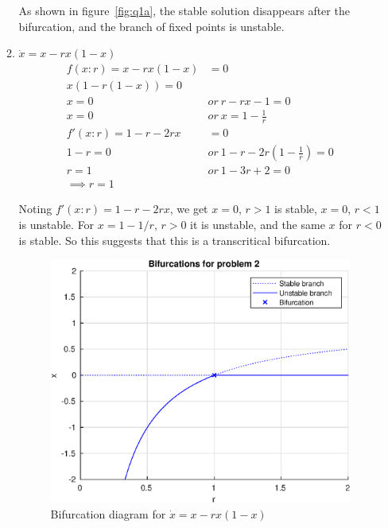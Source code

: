 \documentclass{/home/janmebows/Documents/LatexTemplates/myassignment}
\begin{document}
\begin{enumerate}
\begin{enumerate}
         As shown in figure~\ref{fig:q1a}, the stable solution disappears after the bifurcation, and the branch of fixed points is unstable.


        \item $\dot x = x-rx (1-x)$
        \begin{align*}
            f(x:r) = x - rx(1-x) &=0\\
            x(1-r(1-x)) = 0\\
            x =0 \ &or \ r-rx-1 =0\\
            x = 0 \ &or \ x = 1-\frac{1}{r}\\
            f'(x:r) = 1 - r - 2rx &=0\\
            1 -r = 0 \ &or \ 1 - r - 2r(1 - \frac1r) = 0\\
            r = 1 \ &or \ 1-3r+ 2 = 0\\
            \implies r = 1 
        \end{align*}
        
        Noting $f'(x:r) = 1-r-2rx$, we get $x=0$, $r>1$ is stable, $x=0$, $r <1$ is unstable. For $x = 1-1/r$, $r > 0$ it is unstable, and the same $x$ for $r <0$ is stable. So this suggests that this is a transcritical bifurcation.
        \begin{figure}[H]
             \centering
             \label{fig:q1b}
             \includegraphics{ODEsA2Q1b.eps}
             \caption{Bifurcation diagram for $\dot x = x-rx (1-x)$}
         \end{figure}


\end{enumerate}
\end{enumerate}
\end{document}
